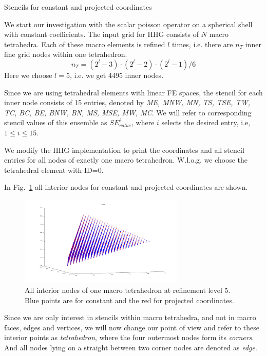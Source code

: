 \documentclass[a4paper,11pt,reqno]{amsart}
\numberwithin{figure}{section}
\numberwithin{table}{section}
\numberwithin{figure}{section}
\def\si{SE_{value}^i}
\begin{document}
\begin{section}{Stencils for constant and projected coordinates}

We start our investigation with the scalar poisson operator on a spherical
shell with constant coefficients. 
The input grid for HHG consists of $N$ macro tetrahedra. Each of these
macro elements is refined $l$ times, i.e. there are $n_T$ inner fine grid nodes
within one tetrahedron.
\begin{equation}
n_T = \left(2^l - 3\right)\cdot\left(2^l - 2\right)\cdot\left(2^l - 1\right)/6
\end{equation}
Here we choose $l=5$, i.e. we get 4495 inner nodes.

Since we are using tetrahedral elements with linear FE spaces, the stencil
for each inner node consists of 15 entries,  denoted by
\emph{ME, MNW, MN, TS, TSE, TW, TC, BC, BE, BNW, BN, MS, MSE, MW, MC}.
We will refer to corresponding stencil values of this ensemble as 
$\si$, where $i$ selects the desired
entry, i.e, $1 \leq i \leq 15$.

We modify the HHG implementation to print the coordinates and all stencil entries
for all nodes of exactly one macro tetrahedron. W.l.o.g. we choose the tetrahedral
element with ID=0.

In Fig.~\ref{fig:tet0Nodes} all interior nodes for constant and projected coordinates
are shown.

\begin{figure}\centering
\includegraphics[width=0.7\textwidth]{pics/tetInnerNodes} 
\caption{All interior nodes of one macro tetrahedron at refinement level 5.
Blue points are for constant and the red for projected coordinates.}
\label{fig:tet0Nodes}
\end{figure}   

Since we are only interest in stencils within macro tetrahedra, and not in macro faces,
edges and vertices, we will now change our point of view and refer to these interior points
as \emph{tetrahedron}, where the four outermost nodes form its \emph{corners}. 
And all nodes lying on a straight between two corner nodes are denoted as \emph{edge}.



\end{section}
\end{document}
